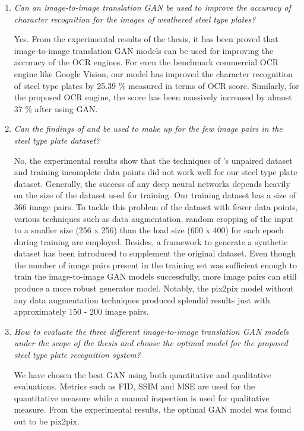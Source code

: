 \begin{enumerate}
\item \textit{Can an image-to-image translation GAN be used to improve the accuracy of character recognition for the images of weathered steel type plates?}

Yes. From the experimental results of the thesis, it has been proved that image-to-image translation GAN models can be used for improving the accuracy of the OCR engines. For even the benchmark commercial OCR engine like Google Vision, our model has improved the character recognition of steel type plates by 25.39 \% measured in terms of OCR score. Similarly, for the proposed OCR engine, the score has been massively increased by almost 37 \% after using GAN.

\item \textit{Can the findings of \citeauthor{CycleGAN2017} and \citeauthor{stoller2019training} be used to make up for the few image pairs in the steel type plate dataset?}

No, the experimental results show that the techniques of \citeauthor{CycleGAN2017}'s unpaired dataset and \citeauthor{stoller2019training} training incomplete data points did not work well for our steel type plate dataset. Generally, the success of any deep neural networks depends heavily on the size of the dataset used for training. Our training dataset has a size of 366 image pairs. To tackle this problem of the dataset with fewer data points, various techniques such as data augmentation, random cropping of the input to a smaller size (256 x 256) than the load size (600 x 400) for each epoch during training are employed. Besides, a framework to generate a synthetic dataset has been introduced to supplement the original dataset. Even though the number of image pairs present in the training set was sufficient enough to train the image-to-image GAN models successfully, more image pairs can still produce a more robust generator model. Notably, the pix2pix model without any data augmentation techniques produced splendid results just with approximately 150 - 200 image pairs.

\item \textit{How to evaluate the three different image-to-image translation GAN models under the scope of the thesis and choose the optimal model for the proposed steel type plate recognition system?}

We have chosen the best GAN using both quantitative and qualitative evaluations. Metrics such as FID, SSIM and MSE are used for the quantitative measure while a manual inspection is used for qualitative measure. From the experimental results, the optimal GAN model was found out to be pix2pix.



\end{enumerate}
